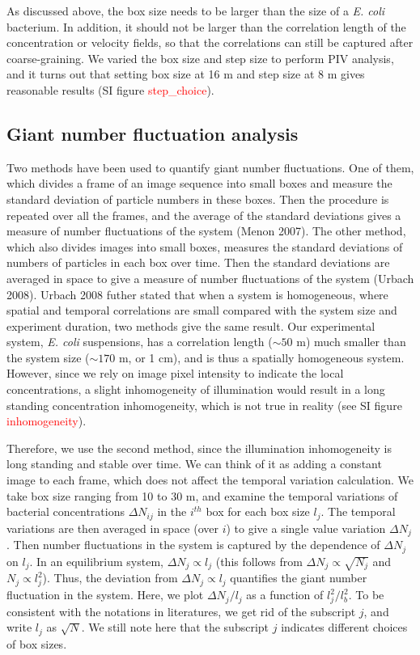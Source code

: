 \documentclass[twocolumn,aps,pre,amsmath,amssymb,floatfix,longbibliography]{revtex4-1}
\begin{document}
As discussed above, the box size needs to be larger than the size of a \textit{E. coli} bacterium. In addition, it should not be larger than the correlation length of the concentration or velocity fields, so that the correlations can still be captured after coarse-graining. We varied the box size and step size to perform PIV analysis, and it turns out that setting box size at 16 \textmu m and step size at 8 \textmu m gives reasonable results (SI figure \textcolor{red}{step\_choice}).

\subsection{Giant number fluctuation analysis}\label{sec:method_gnf}
Two methods have been used to quantify giant number fluctuations. One of them, which divides a frame of an image sequence into small boxes and measure the standard deviation of particle numbers in these boxes. Then the procedure is repeated over all the frames, and the average of the standard deviations gives a measure of number fluctuations of the system (Menon 2007). The other method, which also divides images into small boxes, measures the standard deviations of numbers of particles in each box over time. Then the standard deviations are averaged in space to give a measure of number fluctuations of the system (Urbach 2008). Urbach 2008 futher stated that when a system is homogeneous, where spatial and temporal correlations are small compared with the system size and experiment duration, two methods give the same result. Our experimental system, \textit{E. coli} suspensions, has a correlation length ($\sim 50$ \textmu m) much smaller than the system size ($\sim 170$ \textmu m, or 1 cm), and is thus a spatially homogeneous system. However, since we rely on image pixel intensity to indicate the local concentrations, a slight inhomogeneity of illumination would result in a long standing concentration inhomogeneity, which is not true in reality (see SI figure \textcolor{red}{inhomogeneity}).

Therefore, we use the second method, since the illumination inhomogeneity is long standing and stable over time. We can think of it as adding a constant image to each frame, which does not affect the temporal variation calculation. We take box size ranging from 10 to 30 \textmu m, and examine the temporal variations of bacterial concentrations $\Delta N_{ij}$ in the $i^{th}$ box for each box size $l_j$. The temporal variations are then averaged in space (over $i$) to give a single value variation $\Delta N_{j}$. Then number fluctuations in the system is captured by the dependence of $\Delta N_{j}$ on $l_j$. In an equilibrium system, $\Delta N_{j}\propto l_j$ (this follows from $\Delta N_{j}\propto \sqrt{N_j}$ and $N_j\propto l_j^2$). Thus, the deviation from $\Delta N_{j}\propto l_j$ quantifies the giant number fluctuation in the system. Here, we plot $\Delta N_{j}/l_j$ as a function of $l_j^2/l_b^2$. To be consistent with the notations in literatures, we get rid of the subscript $j$, and write $l_j$ as $\sqrt{N}$. We still note here that the subscript $j$ indicates different choices of box sizes.
\end{document}
